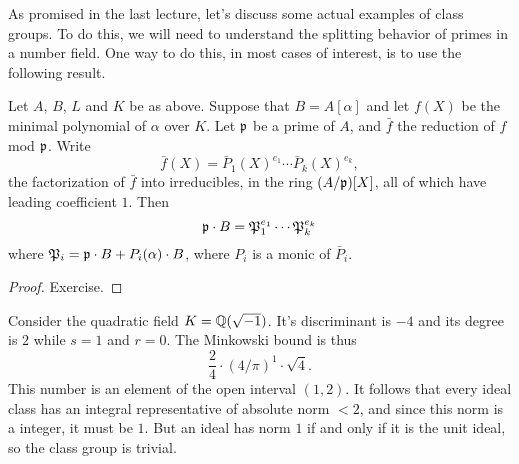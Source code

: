 As promised in the last lecture, let's discuss some actual examples of class groups.
To do this, we will need to understand the splitting behavior of primes in a number field.
One way to do this, in most cases of interest, is to use the following result.
\begin{proposition}
  Let $A$, $B$, $L$ and $K$ be as above.
  Suppose that $B = A[\alpha]$ and let $f(X)$ be the minimal polynomial of $\alpha$ over $K$.
  Let $\mathfrak{p}$ be a prime of $A$, and $\bar f$ the reduction of $f$ mod $\mathfrak{p}$.
  Write
  \[ \bar f(X) = \bar P_{1}(X)^{e_{1}} \cdots \bar P_{k}(X)^{e_{k}}, \]
  the factorization of $\bar f$ into irreducibles, in the ring $(A/\mathfrak{p})[X]$, all of which have leading coefficient $1$.
  Then
  \[ \mathfrak{p} \cdot B = \mathfrak{P}_{1}^{e_{1}} \cdots \mathfrak{P}_{k}^{e_{k}} \]
  where $\mathfrak{P}_{i} = \mathfrak{p} \cdot B + P_{i}(\alpha) \cdot B$, where $P_{i}$ is a monic of $\bar P_{i}$.
\end{proposition}
\begin{proof}
  Exercise.
\end{proof}

\begin{example}
  Consider the quadratic field $K = \mathbb{Q}(\sqrt{-1})$.
  It's discriminant is $-4$ and its degree is $2$ while $s = 1$ and $r = 0$.
  The Minkowski bound is thus
  \[ \frac{2}{4} \cdot (4/\pi)^{1} \cdot \sqrt{4}. \]
  This number is an element of the open interval $(1,2)$.
  It follows that every ideal class has an integral representative of absolute norm $< 2$, and since this norm is a integer, it must be $1$.
  But an ideal has norm $1$ if and only if it is the unit ideal, so the class group is trivial.
\end{example}


